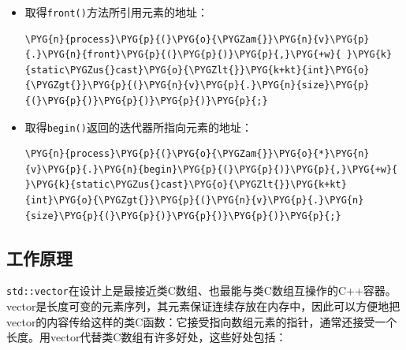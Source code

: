 \begin{itemize}

\item 取得\texttt{front()}方法所引用元素的地址：



\begin{codeblockbg}
\begin{Verbatim}[commandchars=\\\{\},breaklines=true,breakanywhere=true,fontsize=\codefont,xleftmargin=17bp]
\PYG{n}{process}\PYG{p}{(}\PYG{o}{\PYGZam{}}\PYG{n}{v}\PYG{p}{.}\PYG{n}{front}\PYG{p}{(}\PYG{p}{)}\PYG{p}{,}\PYG{+w}{ }\PYG{k}{static\PYGZus{}cast}\PYG{o}{\PYGZlt{}}\PYG{k+kt}{int}\PYG{o}{\PYGZgt{}}\PYG{p}{(}\PYG{n}{v}\PYG{p}{.}\PYG{n}{size}\PYG{p}{(}\PYG{p}{)}\PYG{p}{)}\PYG{p}{)}\PYG{p}{;}
\end{Verbatim}
\end{codeblockbg}



\item 取得\texttt{begin()}返回的迭代器所指向元素的地址：



\begin{codeblockbg}
\begin{Verbatim}[commandchars=\\\{\},breaklines=true,breakanywhere=true,fontsize=\codefont,xleftmargin=17bp]
\PYG{n}{process}\PYG{p}{(}\PYG{o}{\PYGZam{}}\PYG{o}{*}\PYG{n}{v}\PYG{p}{.}\PYG{n}{begin}\PYG{p}{(}\PYG{p}{)}\PYG{p}{,}\PYG{+w}{ }\PYG{k}{static\PYGZus{}cast}\PYG{o}{\PYGZlt{}}\PYG{k+kt}{int}\PYG{o}{\PYGZgt{}}\PYG{p}{(}\PYG{n}{v}\PYG{p}{.}\PYG{n}{size}\PYG{p}{(}\PYG{p}{)}\PYG{p}{)}\PYG{p}{)}\PYG{p}{;}
\end{Verbatim}
\end{codeblockbg}

\end{itemize}



\subsection{工作原理}



\texttt{std::\allowbreak{}vector}在设计上是最接近类C数组、也最能与类C数组互操作的C++容器。vector是长度可变的元素序列，其元素保证连续存放在内存中，因此可以方便地把vector的内容传给这样的类C函数：它接受指向数组元素的指针，通常还接受一个长度。用vector代替类C数组有许多好处，这些好处包括：


